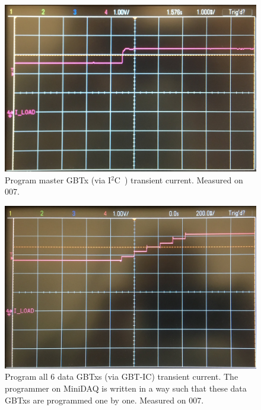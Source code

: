\documentclass[11pt,letterpaper]{refart}
\def\itwoc{I{$\scriptstyle^2$}C\ }
\begin{document}
\begin{figure}[ht]
    \centering
    \includegraphics[width=0.8\linewidth]
        {./res/current_transient/program_master.jpg}
    \caption[Program master GBTx transient current]{
        Program master GBTx (via \itwoc) transient current.
        Measured on 007.
    }
\end{figure}

\begin{figure}[ht]
    \centering
    \includegraphics[width=0.8\linewidth]
        {./res/current_transient/program_data.jpg}
    \caption[Program data GBTxs transient current]{
        Program all 6 data GBTxs (via GBT-IC) transient current.
        The programmer on MiniDAQ is written in a way such that these data GBTxs
        are programmed one by one.
        Measured on 007.
    }
\end{figure}
\end{document}
